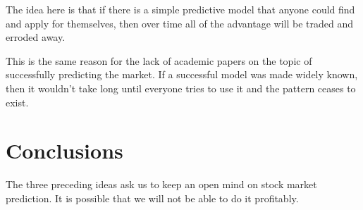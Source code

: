 \documentclass{report}
\begin{document}
The idea here is that if there is a simple predictive model that anyone could find and apply for themselves, then over time all of the advantage will be traded and erroded away.

This is the same reason for the lack of academic papers on the topic of successfully predicting the market. If a successful model was made widely known, then it wouldn't take long until everyone tries to use it and the pattern ceases to exist.

\section{Conclusions}

The three preceding ideas ask us to keep an open mind on stock market prediction. It is possible that we will not be able to do it profitably.
\end{document}

